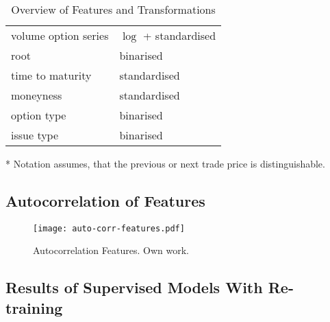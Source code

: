 \begin{table}[H]
\begin{threeparttable}
\begin{tabular}{@{}ll@{}}
            volume option series    & $\log$ + standardised  \\
            root                    & binarised              \\
            time to maturity        & standardised           \\
            moneyness               & standardised           \\
            option type             & binarised              \\
            issue type              & binarised              \\ \bottomrule
        \end{tabular}
        \begin{tablenotes}\footnotesize
            \item[*] Notation assumes, that the previous or next trade price is distinguishable.
        \end{tablenotes}
    \end{threeparttable}
    \caption[Overview of Features and Transformations]{Overview of Features and Transformations}
    \label{tab:features-transformations}
\end{table}

\newpage
\subsection{Autocorrelation of Features}
\label{app:autocorrelation-of-features}

\begin{figure}[ht]
    \centering
    \texttt{[image: auto-corr-features.pdf]}
    \caption[Autocorrelation of Features]{Autocorrelation Features. Own work.}
    \label{fig:auto-correlation-features}
\end{figure}

\newpage
\subsection{Results of Supervised Models With Re-training}
\label{app:results-of-supervised-models-with-re-training}

